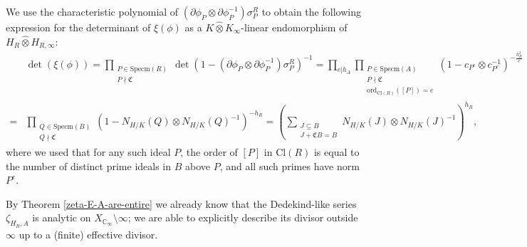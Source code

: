 \documentclass[11pt]{amsart}
\numberwithin{equation}{section}
\newcommand{\CC}{\mathbb{C}}
\begin{document}
We use the characteristic polynomial of $(\partial\phi_P\otimes\partial\phi_P^{-1})\sigma^R_P$ to obtain the following expression for the determinant of $\xi(\phi)$ as a $K\hat\otimes K_\infty$-linear endomorphism of $H_R\hat\otimes H_{R,\infty}$:
\begin{align*}
    &\det(\xi(\phi))=\prod_{\substack{P\in\mathrm{Specm}(R)\\P\nmid\mathfrak{C}}}\det(1-(\partial\phi_P\otimes\partial\phi_P^{-1}){\sigma^R_P})^{-1}=\prod_{e|h_A}\prod_{\substack{P\in\mathrm{Specm}(A)\\P\nmid\mathfrak{C}\\\mathrm{ord}_{\mathrm{Cl}(R)}([P])=e}}(1-c_{P^e}\otimes c_{P^e}^{-1})^{-\frac{h_R^2}{e}}\\
    =&\prod_{\substack{Q\in\mathrm{Specm}(B)\\Q\nmid\mathfrak{C}}}(1- N_{H/K}(Q)\otimes N_{H/K}(Q)^{-1})^{-h_R}=\left(\sum_{\substack{J\subseteq B\\J+\mathfrak{C}B=B}} N_{H/K}(J)\otimes N_{H/K}(J)^{-1}\right)^{h_R},
\end{align*}
where
we used that for any such ideal $P$, the order of $[P]$ in $\mathrm{Cl}(R)$ is equal to the number of distinct prime ideals in $B$ above $P$, and all such primes have norm $P^e$.

By Theorem \ref{zeta-E-A-are-entire} we already know that the Dedekind-like series $\zeta_{H_R,A}$ is analytic on $X_{\CC_\infty}\setminus\infty$; we are able to explicitly describe its divisor outside $\infty$ up to a (finite) effective divisor.
\end{document}
